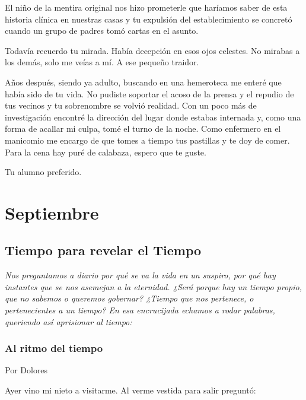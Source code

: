 \documentclass[11pt,twoside,openright,a5paper]{book}
\begin{document}
El niño de la mentira original nos hizo prometerle que haríamos saber de esta historia clínica en nuestras casas y tu expulsión del establecimiento se concretó cuando un grupo de padres tomó cartas en el asunto.

Todavía recuerdo tu mirada. Había decepción en esos ojos celestes. No mirabas a los demás, solo me veías a mí. A ese pequeño traidor.

Años después, siendo ya adulto, buscando en una hemeroteca me enteré que había sido de tu vida. No pudiste soportar el acoso de la prensa y el repudio de tus vecinos y tu sobrenombre se volvió realidad. Con un poco más de investigación encontré la dirección del lugar donde estabas internada y, como una forma de acallar mi culpa, tomé el turno de la noche. Como enfermero en el manicomio me encargo de que tomes a tiempo tus pastillas y te doy de comer. Para la cena hay puré de calabaza, espero que te guste.

Tu alumno preferido.

\part*{Septiembre}

\chapter*{Tiempo para revelar el Tiempo}

\vspace{0.5cm}
\emph{Nos preguntamos a diario por qué se va la vida en un suspiro, por qué hay instantes que se nos asemejan a la eternidad. ¿Será porque hay un tiempo propio, que no sabemos o queremos gobernar? ¿Tiempo que nos pertenece, o pertenecientes a un tiempo? En esa encrucijada echamos a rodar palabras, queriendo así aprisionar al tiempo:}

\section*{Al ritmo del tiempo}
                                                                                    \begin{flushright}Por Dolores\end{flushright}

Ayer vino mi nieto a visitarme. Al verme vestida para salir preguntó:
\end{document}
